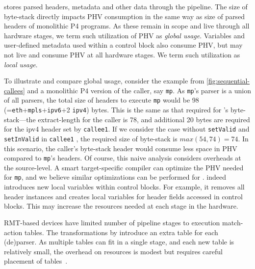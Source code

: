 \documentclass[letterpaper,twocolumn,10pt]{article}
\begin{document}
 stores parsed headers,
metadata and other data through the pipeline. The size of \ulang
byte-stack directly impacts PHV consumption in the same way as size of
parsed headers of monolithic P4 programs. As these remain in scope and
live through all hardware stages, we term such utilization of PHV as
\emph{global usage}. Variables and user-defined metadata used within a
control block also consume PHV, but may not live and consume PHV
at all hardware stages. We term such utilization as \emph{local usage}.

To illustrate and compare global usage, consider the example from
\cref{fig:sequential-callees} and a monolithic P4 version of the
caller, say \texttt{mp}. As \texttt{mp}'s parser is a union of all
parsers, the total size of headers to execute \texttt{mp} would be 98
(=\texttt{eth}+\texttt{mpls}+\texttt{ipv6}+2 \texttt{ipv4}) bytes.
This is the same as that required for \ulang's byte-stack---the
extract-length for the caller is 78, and additional 20 bytes are
required for the ipv4 header set by \texttt{callee1}.  If we consider
the case without \texttt{setValid} and \texttt{setInValid} in
\texttt{callee1} , the required size of byte-stack is $max(54, 74) =
74$. In this scenario, the caller's byte-stack header would consume
less space in PHV compared to \texttt{mp}'s headers. Of course, this
naive analysis considers overheads at the source-level. A smart
target-specific compiler can optimize the PHV needed for \texttt{mp},
and we believe similar optimizations can be performed for \ulang.
\ucomp indeed introduces new local variables within control blocks.
For example, it removes all header instances and creates local
variables for header fields accessed in control blocks. This may
increase the resources needed at each stage in the hardware.



%
RMT-based devices have limited number of pipeline stages to execution
match-action tables. The transformations by \ucomp introduce an extra table
for each (de)parser. As multiple tables can fit in a single stage, and
each new table is relatively small, the overhead on resources is modest
but requires careful placement of tables~\cite{jose2015compiling}.
\end{document}
